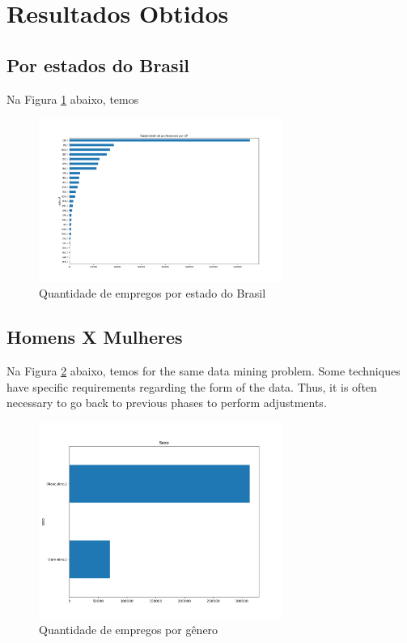 \section{Resultados Obtidos}

\subsection{Por estados do Brasil}

Na Figura \ref{fig_graf_sigla_uf} abaixo, temos

\begin{figure}[htbp]
	\centerline{
		\includegraphics[width=80mm,scale=1]{assets/graf_sigla_uf.png}
	}
	\caption{Quantidade de empregos por estado do Brasil}
	\label{fig_graf_sigla_uf}
\end{figure}

\subsection{Homens X Mulheres}

Na Figura \ref{fig_graf_sexo} abaixo, temos for the same data mining problem. Some techniques have specific requirements regarding the form of the data. Thus, it is often necessary to go back to previous phases to perform adjustments.

\begin{figure}[htbp]
	\centerline{
		\includegraphics[width=80mm,scale=1]{assets/graf_sexo.png}
	}
	\caption{Quantidade de empregos por gênero}
	\label{fig_graf_sexo}
\end{figure}

